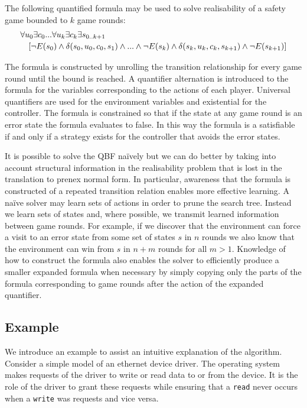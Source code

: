 The following quantified formula may be used to solve realisability of a safety game bounded to $k$ game rounds: 
\begin{equation*}
    \begin{multlined}
        \forall u_0 \exists c_0 ... \forall u_k \exists c_k \exists s_{0..k+1} \\
        \shoveright{[\lnot E(s_0) \land \delta(s_0, u_0, c_0, s_1) \land ... \land \lnot E(s_k) \land \delta(s_k, u_k, c_k, s_{k+1}) \land \lnot E(s_{k+1})]}
    \end{multlined}
\end{equation*}

The formula is constructed by unrolling the transition relationship for every game round until the bound is reached. A quantifier alternation is introduced to the formula for the variables corresponding to the actions of each player. Universal quantifiers are used for the environment variables and existential for the controller. The formula is constrained so that if the state at any game round is an error state the formula evaluates to false. In this way the formula is a satisfiable if and only if a strategy exists for the controller that avoids the error states.

It is possible to solve the QBF na\"ively but we can do better by taking into account structural information in the realisability problem that is lost in the translation to prenex normal form. In particular, awareness that the formula is constructed of a repeated transition relation enables more effective learning. A na\"ive solver may learn sets of actions in order to prune the search tree. Instead we learn sets of states and, where possible, we transmit learned information between game rounds. For example, if we discover that the environment can force a visit to an error state from some set of states $s$ in $n$ rounds we also know that the environment can win from $s$ in $n+m$ rounds for all $m > 1$. Knowledge of how to construct the formula also enables the solver to efficiently produce a smaller expanded formula when necessary by simply copying only the parts of the formula corresponding to game rounds after the action of the expanded quantifier.

\subsection{Example}
\label{sec:boundedexample}

We introduce an example to assist an intuitive explanation of the algorithm. Consider a simple model of an ethernet device driver. The operating system makes requests of the driver to write or read data to or from the device. It is the role of the driver to grant these requests while ensuring that a \texttt{read} never occurs when a \texttt{write} was requests and vice versa.

